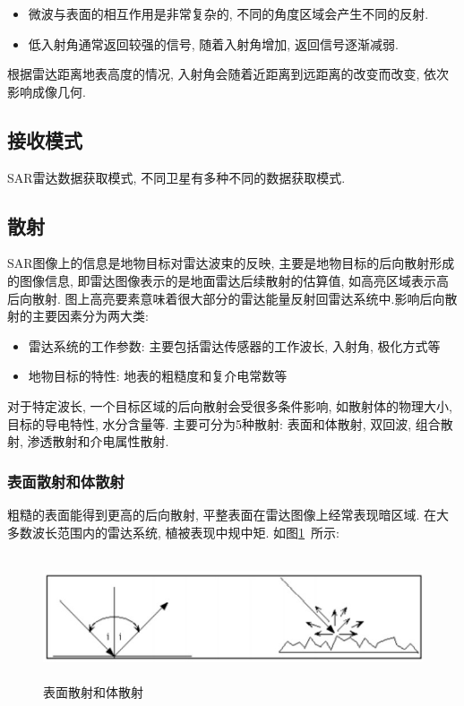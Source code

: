 \begin{itemize}
    \item 微波与表面的相互作用是非常复杂的, 不同的角度区域会产生不同的反射. 
    \item 低入射角通常返回较强的信号, 随着入射角增加, 返回信号逐渐减弱.
\end{itemize}

根据雷达距离地表高度的情况, 入射角会随着近距离到远距离的改变而改变, 依次影响成像几何. 

\subsection{接收模式}
SAR雷达数据获取模式, 不同卫星有多种不同的数据获取模式. 

\subsection{散射}
SAR图像上的信息是地物目标对雷达波束的反映, 主要是地物目标的后向散射形成的图像信息, 即雷达图像表示的是地面雷达后续散射的估算值, 如高亮区域表示高后向散射. 图上高亮要素意味着很大部分的雷达能量反射回雷达系统中.影响后向散射的主要因素分为两大类:
\begin{itemize}
    \item 雷达系统的工作参数: 主要包括雷达传感器的工作波长, 入射角, 极化方式等
    \item 地物目标的特性: 地表的粗糙度和复介电常数等
\end{itemize}

对于特定波长, 一个目标区域的后向散射会受很多条件影响, 如散射体的物理大小, 目标的导电特性, 水分含量等. 主要可分为5种散射: 表面和体散射, 双回波, 组合散射, 渗透散射和介电属性散射.

\subsubsection{表面散射和体散射}
粗糙的表面能得到更高的后向散射, 平整表面在雷达图像上经常表现暗区域. 在大多数波长范围内的雷达系统, 植被表现中规中矩. 如图\ref{fig:0104}~所示:
\begin{figure}[htbp]
    \centering
    \includegraphics[height=10em]{pic/chap01xx03.jpg}
    \caption{表面散射和体散射}
    \label{fig:0104}
\end{figure}


